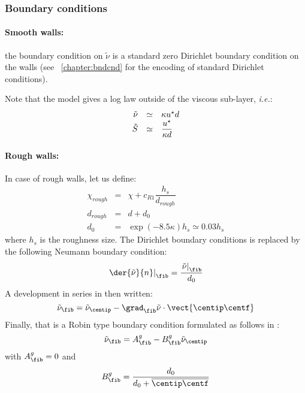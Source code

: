 \subsubsection{Boundary conditions}

\paragraph{Smooth walls:}
the boundary condition on $\tilde{\nu}$ is a standard zero Dirichlet boundary condition on the walls
(see \chaptername~\ref{chapter:bndcnd} for the encoding of standard Dirichlet conditions).

Note that the model gives a log law outside of the viscous sub-layer, \emph{i.e.}:
\begin{equation}
\begin{array}{r c l}
\tilde{\nu} & \simeq & \kappa u^\star d \\
\tilde{S} & \simeq & \dfrac{u^\star}{ \kappa d}
\end{array}
\end{equation}

\paragraph{Rough walls:}
In case of rough walls, let us define:
\begin{equation}
\begin{array}{rcl}
\chi_{rough} & = & \chi + c_{R1} \dfrac{h_s}{d_{rough}} \\
d_{rough} & = & d + d_0 \\
d_0     & = & \exp \left( -8.5 \kappa \right) h_s \simeq 0.03 h_s
\end{array}
\end{equation}
%
where $h_s$ is the roughness size. The Dirichlet boundary conditions
is replaced by the following Neumann boundary condition:
%
\begin{equation}\label{eq:eq_neumann_nu}
\left. \der{\tilde{ \nu}}{n} \right|_\fib = \dfrac{\left. \tilde{ \nu}\right|_\fib }{ d_0}
\end{equation}
%
A development in series in then written:
\begin{equation}\label{eq:eq_neumann_nu_vf}
 \tilde{\nu}_\fib = \tilde{\nu}_{\centip} -   \grad_\fib \tilde{ \nu} \cdot \vect{\centip \centf}
\end{equation}
Finally, that is a Robin type boundary condition formulated as follows in \CS:
\begin{equation}\label{eq:eq_neumann_nu_coef}
 \tilde{\nu}_\fib = A^g_\fib - B^g_\fib \tilde{\nu}_\centip
\end{equation}
with $A^g_\fib=0$ and
%
\begin{equation}\label{eq:eq_neumann_nu_coefb}
 B^g_\fib = \dfrac{d_0}{d_0 + \overline{\centip \centf} }
\end{equation}

